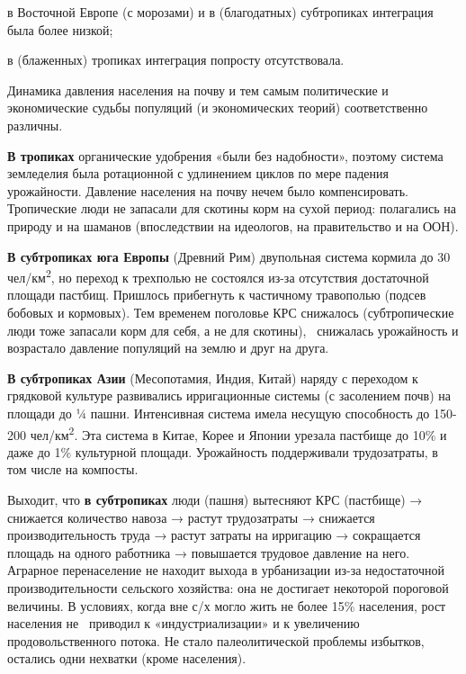 в Восточной Европе (с морозами) и в (благодатных) субтропиках интеграция была более низкой;


в (блаженных) тропиках интеграция попросту отсутствовала.


Динамика давления населения на почву и тем самым политические и экономические судьбы популяций (и экономических теорий)
соответственно различны.


\textbf{В тропиках} органические удобрения «были без надобности», поэтому система земледелия была ротационной с
удлинением циклов по мере падения урожайности. Давление населения на почву нечем было компенсировать. Тропические люди
не запасали для скотины корм на сухой период: полагались на природу и на шаманов (впоследствии на идеологов, на
правительство и на ООН).


\textbf{В субтропиках юга Европы} (Древний Рим) двупольная система кормила до 30 чел/км\textsuperscript{2}, но переход к
трехполью не состоялся из-за отсутствия достаточной площади пастбищ. Пришлось прибегнуть к частичному травополью
(подсев бобовых и кормовых). Тем временем поголовье КРС снижалось (субтропические люди тоже запасали корм для себя, а
не для скотины), \ снижалась урожайность и возрастало давление популяций на землю и друг на друга.


\textbf{В субтропиках Азии} (Месопотамия, Индия, Китай) наряду с переходом к грядковой культуре развивались
ирригационные системы (с засолением почв) на площади до ¼ пашни. Интенсивная система имела несущую способность до
150-200 чел/км\textsuperscript{2}. Эта система в Китае, Корее и Японии урезала пастбище до 10\% и даже до 1\%
культурной площади. Урожайность поддерживали трудозатраты, в том числе на компосты.


Выходит, что \textbf{в субтропиках} люди (пашня) вытесняют КРС (пастбище) → снижается количество навоза → растут
трудозатраты → снижается производительность труда → растут затраты на ирригацию → сокращается площадь на одного
работника → повышается трудовое давление на него. Аграрное перенаселение не находит выхода в урбанизации из-за
недостаточной производительности сельского хозяйства: она не достигает некоторой пороговой величины. В условиях, когда
вне с/х могло жить не более 15\% населения, рост населения не \ приводил к «индустриализации» и к увеличению
продовольственного потока. Не стало палеолитической проблемы избытков, остались одни нехватки (кроме населения).


